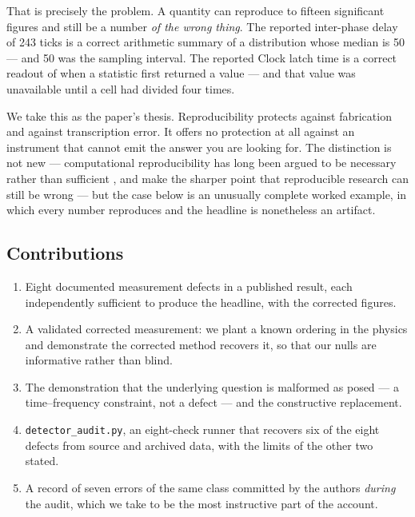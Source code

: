 \documentclass[11pt,letterpaper]{article}
\begin{document}
That is precisely the problem. A quantity can reproduce to fifteen
significant figures and still be a number \emph{of the wrong thing}.
The reported inter-phase delay of 243 ticks is a correct arithmetic
summary of a distribution whose median is 50 --- and 50 was the
sampling interval. The reported Clock latch time is a correct readout of
when a statistic first returned a value --- and that value was
unavailable until a cell had divided four times.

We take this as the paper's thesis. Reproducibility protects against
fabrication and against transcription error. It offers no protection at
all against an instrument that cannot emit the answer you are looking
for. The distinction is not new --- computational reproducibility has
long been argued to be necessary rather than sufficient
\citep{peng2011,stodden2016}, and \citet{leek2015} make the sharper
point that reproducible research can still be wrong --- but the case
below is an unusually complete worked example, in which every number
reproduces and the headline is nonetheless an artifact.

\subsection{Contributions}

\begin{enumerate}
\item Eight documented measurement defects in a published result, each
      independently sufficient to produce the headline, with the
      corrected figures.
\item A validated corrected measurement: we plant a known ordering in
      the physics and demonstrate the corrected method recovers it,
      so that our nulls are informative rather than blind.
\item The demonstration that the underlying question is malformed as
      posed --- a time--frequency constraint, not a defect --- and the
      constructive replacement.
\item \texttt{detector\_audit.py}, an eight-check runner that recovers
      six of the eight defects from source and archived data, with the
      limits of the other two stated.
\item A record of seven errors of the same class committed by the
      authors \emph{during} the audit, which we take to be the most
      instructive part of the account.
\end{enumerate}
\end{document}
